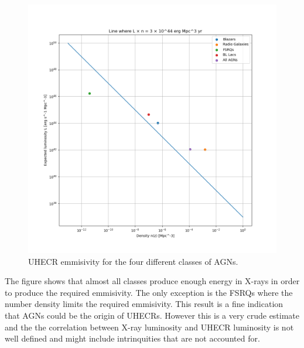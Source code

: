 \documentclass{article}
\begin{document}
\begin{figure}
    \centering
    \includegraphics[width = \textwidth]{L_n_line.png}
    \caption{UHECR emmisivity for the four different classes of AGNs.}
    \label{fig:UHECR}
\end{figure}

The figure shows that almost all classes produce enough energy in X-rays in order to produce the required emmisivity. The only exception is the FSRQs where the number
density limits the required emmisivity. This result is a fine indication that AGNs could be the origin of UHECRs. However this is a very crude estimate and the
the correlation between X-ray luminosity and UHECR luminosity is not well defined and might include intrinquities that are not accounted for.






\end{document}

